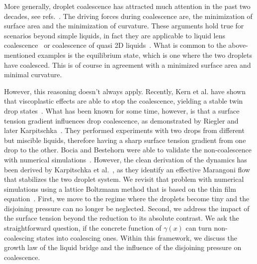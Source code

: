 \documentclass[twocolumn,amsmath,amssymb,showpacs,pre,nofootinbib,superscriptaddress]{revtex4-1} %
\begin{document}
More generally, droplet coalescence has attracted much attention in the past two decades, see refs.~\cite{eggers_lister_stone_1999, duchemin_eggers_josserand_2003, PhysRevLett.95.164503, PhysRevLett.106.114501, doi:10.1063/1.4828721}. 
The driving forces during coalescence are, the minimization of surface area and the minimization of curvature. 
These arguments hold true for scenarios beyond simple liquids, in fact they are applicable to liquid lens coalescence~\cite{PhysRevLett.124.194502} or coalescence of quasi 2D liquids~\cite{klopp2020self, doi:10.1021/acs.langmuir.0c02139}.
What is common to the above-mentioned examples is the equilibrium state, which is one where the two droplets have coalesced.
This is of course in agreement with a minimized surface area and minimal curvature.

However, this reasoning doesn't always apply. 
Recently, Kern et al. have shown that viscoplastic effects are able to stop the coalescence, yielding a stable twin drop states~\cite{https://doi.org/10.48550/arxiv.2203.15617}.
What has been known for some time, however, is that a surface tension gradient influences drop coalescence, as demonstrated by Riegler and later Karpitschka~\cite{PhysRevLett.109.066103, doi:10.1021/la500459v, karpitschka2014sharp, bruning2018delayed}.
They performed experiments with two drops from different but miscible liquids, therefore having a sharp surface tension gradient from one drop to the other.
Bocia and Bestehorn were able to validate the non-coalescence with numerical simulations~\cite{PhysRevE.82.036312, borcia2011coalescence}.
However, the clean derivation of the dynamics has been derived by Karpitschka et al.~\cite{PhysRevLett.109.066103}, as they identify an effective Marangoni flow that stabilizes the two droplet system.
We revisit that problem with numerical simulations using a lattice Boltzmann method that is based on the thin film equation~\cite{PhysRevE.100.033313}.
First, we move to the regime where the droplets become tiny and the disjoining pressure can no longer be neglected.
Second, we address the impact of the surface tension beyond the reduction to its absolute contrast.
We ask the straightforward question, if the concrete function of $\gamma(x)$ can turn non-coalescing states into coalescing ones.
Within this framework, we discuss the growth law of the liquid bridge and the influence of the disjoining pressure on coalescence.
\end{document}
